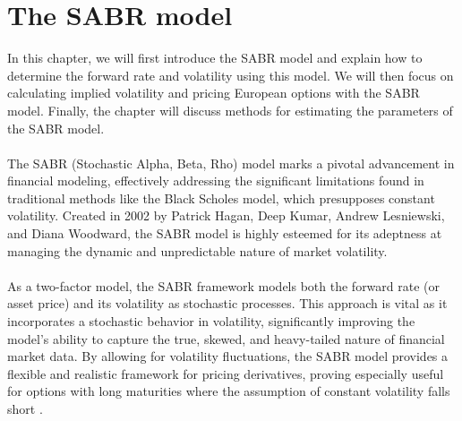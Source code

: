 \section{ The SABR model}
In this chapter, we will first introduce the SABR model
 and explain how to determine the forward rate and 
 volatility using this model. We will then focus on 
 calculating implied volatility and pricing European 
 options with the SABR model. Finally, the chapter 
 will discuss methods for estimating the parameters 
 of the SABR model.
\\\\
The SABR (Stochastic Alpha, Beta, Rho) model marks a pivotal advancement 
in financial modeling, effectively addressing the significant limitations 
found in traditional methods like the Black Scholes model, which presupposes 
constant volatility. Created in 2002 by Patrick Hagan, Deep Kumar, 
Andrew Lesniewski, and Diana Woodward, the SABR model is highly esteemed for 
its adeptness at managing the dynamic and unpredictable nature of market 
volatility.
\\\\
As a two-factor model, the SABR framework models both the forward rate 
(or asset price) and its volatility as stochastic processes. This approach 
is vital as it incorporates a stochastic behavior in volatility, significantly 
improving the model's ability to capture the true, skewed, and heavy-tailed 
nature of financial market data. By allowing for volatility fluctuations, 
the SABR model provides a flexible and realistic framework for pricing 
derivatives, proving especially useful for options with long maturities where 
the assumption of constant volatility falls short \cite{Smile}.

